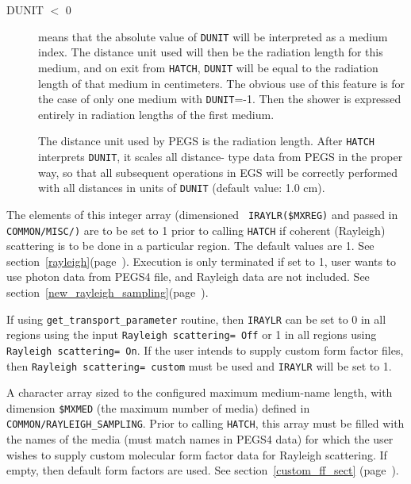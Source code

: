 \begin{description}
\begin{description}
 \item[DUNIT $<$ 0] means that the absolute value of {\tt DUNIT} will be
interpreted as a medium index.  The distance unit used will then be the
radiation length for this medium, and on exit from {\tt HATCH}, {\tt DUNIT} will be
equal to the radiation length of that medium in centimeters.  The obvious
use of this feature is for the case of only one medium with {\tt DUNIT}=-1.  Then
the shower is expressed entirely in radiation lengths of the first medium.


The distance unit used by PEGS is the radiation length.  After {\tt HATCH}
interprets {\tt DUNIT}, it scales all distance- type data from PEGS in the proper
way, so that all subsequent operations in EGS will be correctly performed
with all distances in units of {\tt DUNIT} (default value: 1.0 cm).
\end{description}


\item[IRAYLR] The elements of this integer array (dimensioned {\tt
IRAYLR(\$MXREG)} and passed in\\ {\tt COMMON/MISC/)} are to be set to 1
prior to calling {\tt HATCH} if coherent (Rayleigh) scattering is to be done
in a particular region. The default values are 1.
See section~\ref{rayleigh}(page~\pageref{rayleigh}).
Execution is only terminated if set to 1, user wants to use photon data
from PEGS4 file, and Rayleigh data are not included.
See section~\ref{new_rayleigh_sampling}(page~\pageref{new_rayleigh_sampling}).

If using {\tt get\_transport\_parameter} routine, then {\tt IRAYLR} can
be set to 0 in all regions using the input {\tt Rayleigh scattering= Off}
or 1 in all regions using {\tt Rayleigh scattering= On}. If the user
intends to supply custom form factor files, then
{\tt Rayleigh scattering= custom} must be used and {\tt IRAYLR} will
be set to 1.

\item[iray\_ff\_media] A character array sized to the configured maximum
medium-name length, with
dimension {\tt \$MXMED} (the maximum number of media) defined in
{\tt COMMON/RAYLEIGH\_SAMPLING}.  Prior
to calling {\tt HATCH}, this array must be filled with the
names of the media (must match names in PEGS4 data) for which the user
wishes to supply custom molecular form factor data for Rayleigh
scattering.  If empty, then default form factors are used.
See section~\ref{custom_ff_sect} (page~\pageref{custom_ff_sect}).


\end{description}
